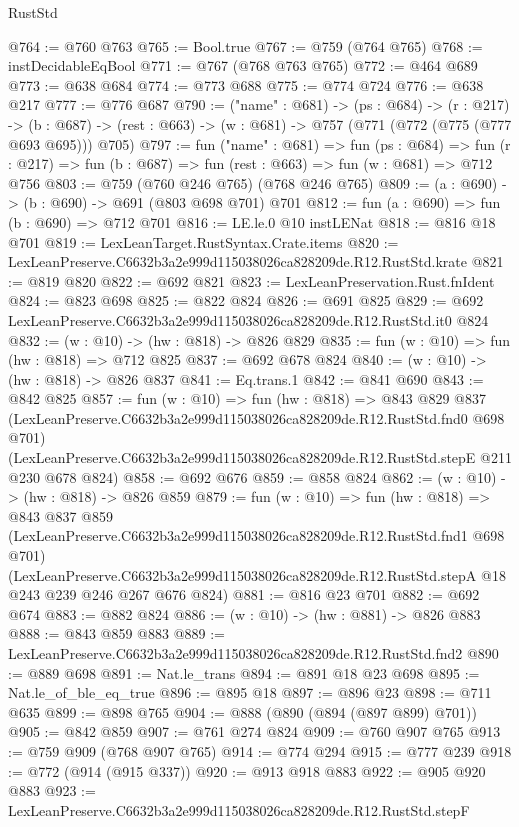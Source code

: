 \begin{lexlean}{RustStd}
\begin{coremodule}
@764 := @760 @763
@765 := Bool.true
@767 := @759 (@764 @765)
@768 := instDecidableEqBool
@771 := @767 (@768 @763 @765)
@772 := @464 @689
@773 := @638 @684
@774 := @773 @688
@775 := @774 @724
@776 := @638 @217
@777 := @776 @687
@790 := ("name" : @681) ->
  (ps : @684) ->
  (r : @217) ->
  (b : @687) -> (rest : @663) -> (w : @681) -> @757 (@771 (@772 (@775 (@777 @693 @695))) @705)
@797 := fun ("name" : @681) =>
  fun (ps : @684) =>
  fun (r : @217) => fun (b : @687) => fun (rest : @663) => fun (w : @681) => @712 @756
@803 := @759 (@760 @246 @765) (@768 @246 @765)
@809 := (a : @690) -> (b : @690) -> @691 (@803 @698 @701) @701
@812 := fun (a : @690) => fun (b : @690) => @712 @701
@816 := LE.le.{0} @10 instLENat
@818 := @816 @18 @701
@819 := LexLeanTarget.RustSyntax.Crate.items
@820 := LexLeanPreserve.C6632b3a2e999d115038026ca828209de.R12.RustStd.krate
@821 := @819 @820
@822 := @692 @821
@823 := LexLeanPreservation.Rust.fnIdent
@824 := @823 @698
@825 := @822 @824
@826 := @691 @825
@829 := @692 LexLeanPreserve.C6632b3a2e999d115038026ca828209de.R12.RustStd.it0 @824
@832 := (w : @10) -> (hw : @818) -> @826 @829
@835 := fun (w : @10) => fun (hw : @818) => @712 @825
@837 := @692 @678 @824
@840 := (w : @10) -> (hw : @818) -> @826 @837
@841 := Eq.trans.{1}
@842 := @841 @690
@843 := @842 @825
@857 := fun (w : @10) =>
  fun (hw : @818) =>
  @843
    @829
    @837
    (LexLeanPreserve.C6632b3a2e999d115038026ca828209de.R12.RustStd.fnd0 @698 @701)
    (LexLeanPreserve.C6632b3a2e999d115038026ca828209de.R12.RustStd.stepE @211 @230 @678 @824)
@858 := @692 @676
@859 := @858 @824
@862 := (w : @10) -> (hw : @818) -> @826 @859
@879 := fun (w : @10) =>
  fun (hw : @818) =>
  @843
    @837
    @859
    (LexLeanPreserve.C6632b3a2e999d115038026ca828209de.R12.RustStd.fnd1 @698 @701)
    (LexLeanPreserve.C6632b3a2e999d115038026ca828209de.R12.RustStd.stepA
      @18
      @243
      @239
      @246
      @267
      @676
      @824)
@881 := @816 @23 @701
@882 := @692 @674
@883 := @882 @824
@886 := (w : @10) -> (hw : @881) -> @826 @883
@888 := @843 @859 @883
@889 := LexLeanPreserve.C6632b3a2e999d115038026ca828209de.R12.RustStd.fnd2
@890 := @889 @698
@891 := Nat.le_trans
@894 := @891 @18 @23 @698
@895 := Nat.le_of_ble_eq_true
@896 := @895 @18
@897 := @896 @23
@898 := @711 @635
@899 := @898 @765
@904 := @888 (@890 (@894 (@897 @899) @701))
@905 := @842 @859
@907 := @761 @274 @824
@909 := @760 @907 @765
@913 := @759 @909 (@768 @907 @765)
@914 := @774 @294
@915 := @777 @239
@918 := @772 (@914 (@915 @337))
@920 := @913 @918 @883
@922 := @905 @920 @883
@923 := LexLeanPreserve.C6632b3a2e999d115038026ca828209de.R12.RustStd.stepF

\end{coremodule}
\end{lexlean}
